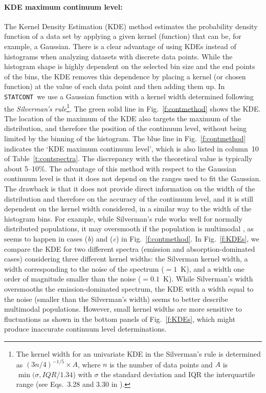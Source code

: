 \documentclass{aa}
\newcommand{\statcont} {\texttt{STATCONT}}
\begin{document}
\paragraph{\textbf{KDE maximum continuum level}:}
The Kernel Density Estimation (KDE) method estimates the probability density function of a data set by applying a given kernel (function) that can be, for example, a Gaussian. There is a clear advantage of using KDEs instead of histograms when analyzing datasets with discrete data points. While the histogram shape is highly dependent on the selected bin size and the end points of the bins, the KDE removes this dependence by placing a kernel (or chosen function) at the value of each data point and then adding them up. In \statcont\ we use a Gaussian function with a kernel width determined following the \textit{Silverman's rule}\footnote{The kernel width for an univariate KDE in the Silverman's rule is determined as $(3n/4)^{-1/5}\times A$, where $n$ is the number of data points and $A$ is $\min({\sigma, IQR/1.34}$) with $\sigma$ the standard deviation and IQR the interquartile range (see Eqs.~3.28 and 3.30 in \citealt{Silverman1998}).}. The green solid line in Fig.~\ref{f:contmethod} shows the KDE. The location of the maximum of the KDE also targets the maximum of the distribution, and therefore the position of the continuum level, without being limited by the binning of the histogram. The blue line in Fig.~\ref{f:contmethod} indicates the `KDE maximum continuum level', which is also listed in column~10 of Table~\ref{t:contspectra}. The discrepancy with the theoretical value is typically about 5--10\%. The advantage of this method with respect to the Gaussian continuum level is that it does not depend on the ranges used to fit the Gaussian. The drawback is that it does not provide direct information on the width of the distribution and therefore on the accuracy of the continuum level, and it is still dependent on the kernel width considered, in a similar way to the width of the histogram bins. For example, while Silverman's rule works well for normally distributed populations, it may oversmooth if the population is multimodal \citep{Silverman1998}, as seems to happen in cases (\textit{b}) and (\textit{c}) in Fig.~\ref{f:contmethod}. In Fig.~\ref{f:KDEs}, we compare the KDE for two different spectra (emission and absorption-dominated cases) considering three different kernel widths: the Silverman kernel width, a width corresponding to the noise of the spectrum ($=1$~K), and a width one order of magnitude smaller than the noise ($=0.1$~K). While Silverman's width oversmooths the emission-dominated spectrum, the KDE with a width equal to the noise (smaller than the Silverman's width) seems to better describe multimodal populations. However, small kernel widths are more sensitive to fluctuations as shown in the bottom panels of Fig.~\ref{f:KDEs}, which might produce inaccurate continuum level determinations.
\end{document}
